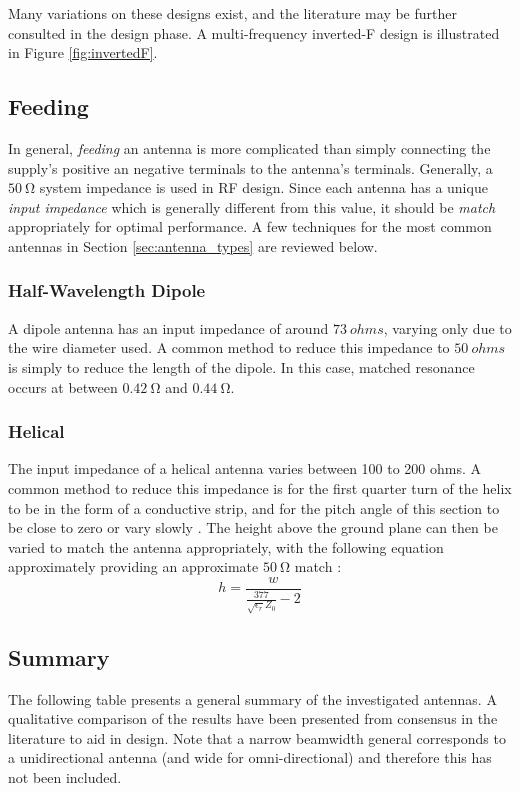 Many variations on these designs exist, and the literature may be further consulted in the design phase. A multi-frequency inverted-F design is illustrated in Figure \ref{fig:invertedF}.

\subsection{Feeding}
In general, \textit{feeding} an antenna is more complicated than simply connecting the supply's positive an negative terminals to the antenna's terminals. Generally, a $\SI{50}{\ohm}$ system impedance is used in RF design. Since each antenna has a unique \textit{input impedance} which is generally different from this value, it should be \textit{match} appropriately for optimal performance. A few techniques for the most common antennas in Section \ref{sec:antenna_types} are reviewed below.

\subsubsection{Half-Wavelength Dipole}
A dipole antenna has an input impedance of around $\SI{73}{ohms}$, varying only due to the wire diameter used. A common method to reduce this impedance to $\SI{50}{ohms}$ is simply to reduce the length of the dipole. In this case, matched resonance occurs at between $\SI{0.42}{\ohm}$ and $\SI{0.44}{\ohm}$. \cite{textbook-antennaTheoryAnalysisDesign}

\subsubsection{Helical}
The input impedance of a helical antenna varies between 100 to 200 ohms. A common method to reduce this impedance is for the first quarter turn of the helix to be in the form of a conductive strip, and for the pitch angle of this section to be close to zero or vary slowly \cite{textbook-antennaTheoryAnalysisDesign}. The height above the ground plane can then be varied to match the antenna appropriately, with the following equation approximately providing an approximate $\SI{50}{\ohm}$ match \cite{textbook-antennaTheoryAnalysisDesign}:
$$h = \frac{w}{\frac{377}{\sqrt{\epsilon_r} Z_0} - 2}$$

\subsection{Summary}
The following table presents a general summary of the investigated antennas. A qualitative comparison of the results have been presented from consensus in the literature to aid in design. Note that a narrow beamwidth general corresponds to a unidirectional antenna (and wide for omni-directional) and therefore this has not been included.


